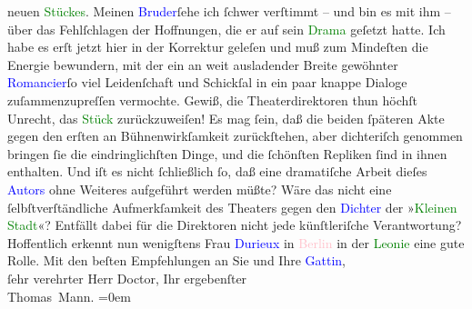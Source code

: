                     neuen \textcolor{green}{Stückes}{}. Meinen \textcolor{blue}{Bruder}{}ſehe ich ſchwer verſtimmt – und bin es mit ihm
                    – über das Fehlſchlagen der Hoffnungen, die er auf sein \textcolor{green}{Drama}{} geſetzt hatte. Ich habe es erſt
                    jetzt hier in der Korrektur geleſen und muß zum Mindeſten die Energie bewundern,
                    mit der ein an weit ausladender Breite gewöhnter \textcolor{blue}{Romancier}{}ſo viel Leidenſchaft und Schickſal in ein paar
                    knappe Dialoge zuſammenzupreſſen vermochte. Gewiß, die Theaterdirektoren thun
                        {\pb}höchſt Unrecht, das \textcolor{green}{Stück}{} zurückzuweiſen! Es mag
                    ſein, daß die beiden ſpäteren Akte gegen den erſten an Bühnenwirkſamkeit
                    zurückſtehen, aber dichteriſch genommen bringen ſie die eindringlichſten Dinge,
                    und die ſchönſten Repliken ſind in ihnen enthalten. Und iſt es nicht ſchließlich
                    ſo, daß eine dramatiſche Arbeit dieſes \textcolor{blue}{Autors}{} ohne Weiteres aufgeführt werden müßte? Wäre
                    das nicht eine ſelbſtverſtändliche Aufmerkſamkeit des Theaters gegen den \textcolor{blue}{Dichter}{} der »\textcolor{green}{Kleinen Stadt}{}\ledrightnote{\textcolor{green}{Die kleine Stadt}}«? Entfällt da{\pb}bei für die Direktoren nicht jede
                    künſtleriſche Verantwortung? Hoffentlich erkennt nun wenigſtens Frau \textcolor{blue}{Durieux}{}\ledrightnote{\textcolor{blue}{Tilla Durieux}} in \textcolor{pink}{Berlin}{}\ledrightnote{\textcolor{pink}{Berlin}} in der \textcolor{green}{Leonie}{} eine gute Rolle.\pend
           \pstart
           Mit den beſten Empfehlungen an Sie und Ihre \textcolor{blue}{Gattin}{}, {\\}ſehr verehrter Herr Doctor,\pend
           \pstart
           Ihr ergebenſter{\\[\baselineskip]}\spacefill\mbox{Thomas Mann.}\pend
           \leftskip=0em{}\endnumbering{}  
      